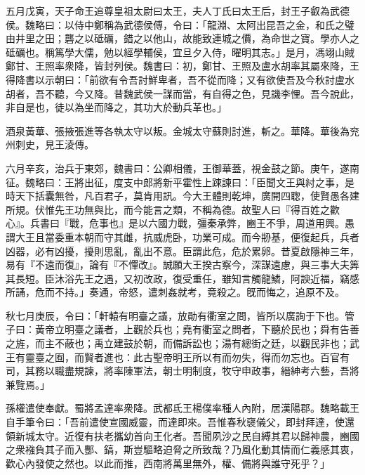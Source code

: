\begin{pinyinscope}
五月戊寅，天子命王追尊皇祖太尉曰太王，夫人丁氏曰太王后，封王子叡為武德侯。魏略曰：以侍中鄭稱為武德侯傅，令曰：「龍淵、太阿出昆吾之金，和氏之璧由井里之田；礱之以砥礪，錯之以他山，故能致連城之價，為命世之寶。學亦人之砥礪也。稱篤學大儒，勉以經學輔侯，宜旦夕入侍，曜明其志。」是月，馮翊山賊鄭甘、王照率衆降，皆封列侯。魏書曰：初，鄭甘、王照及盧水胡率其屬來降，王得降書以示朝曰：「前欲有令吾討鮮卑者，吾不從而降；又有欲使吾及今秋討盧水胡者，吾不聽，今又降。昔魏武侯一謀而當，有自得之色，見譏李悝。吾今說此，非自是也，徒以為坐而降之，其功大於動兵革也。」

酒泉黃華、張掖張進等各執太守以叛。金城太守蘇則討進，斬之。華降。華後為兖州刺史，見王淩傳。

六月辛亥，治兵于東郊，魏書曰：公卿相儀，王御華蓋，視金鼓之節。庚午，遂南征。魏略曰：王將出征，度支中郎將新平霍性上踈諫曰：「臣聞文王與紂之事，是時天下括囊無咎，凡百君子，莫肯用訊。今大王體則乾坤，廣開四聦，使賢愚各建所規。伏惟先王功無與比，而今能言之類，不稱為德。故聖人曰『得百姓之歡心』。兵書曰『戰，危事也』是以六國力戰，彊秦承弊，豳王不爭，周道用興。愚謂大王且當委重本朝而守其雌，抗威虎卧，功業可成。而今刱基，便復起兵，兵者凶器，必有凶擾，擾則思亂，亂出不意。臣謂此危，危於累卵。昔夏啟隱神三年，易有『不遠而復』，論有『不憚改』。誠願大王揆古察今，深謀遠慮，與三事大夫筭其長短。臣沐浴先王之遇，又初改政，復受重任，雖知言觸龍鱗，阿諛近福，竊感所誦，危而不持。」奏通，帝怒，遣刺姦就考，竟殺之。旣而悔之，追原不及。

秋七月庚辰，令曰：「軒轅有明臺之議，放勛有衢室之問，皆所以廣詢于下也。管子曰：黃帝立明臺之議者，上觀於兵也；堯有衢室之問者，下聽於民也；舜有告善之旌，而主不蔽也；禹立建鼓於朝，而備訴訟也；湯有總街之廷，以觀民非也；武王有靈臺之囿，而賢者進也：此古聖帝明王所以有而勿失，得而勿忘也。百官有司，其務以職盡規諫，將率陳軍法，朝士明制度，牧守申政事，縉紳考六藝，吾將兼覽焉。」

孫權遣使奉獻。蜀將孟達率衆降。武都氐王楊僕率種人內附，居漢陽郡。魏略載王自手筆令曰：「吾前遣使宣國威靈，而達即來。吾惟春秋襃儀父，即封拜達，使還領新城太守。近復有扶老攜幼首向王化者。吾聞夙沙之民自縛其君以歸神農，豳國之衆襁負其子而入酆、鎬，斯豈驅略迫脅之所致哉？乃風化動其情而仁義感其衷，歡心內發使之然也。以此而推，西南將萬里無外，權、備將與誰守死乎？」


\end{pinyinscope}
